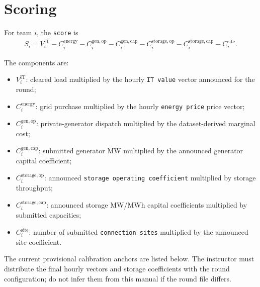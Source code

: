 \documentclass[12pt]{article}
\newcommand{\code}[1]{\texttt{#1}}
\begin{document}
\section{Scoring}\label{sec:score}

For team $i$, the \code{score} is
\[
\begin{aligned}
S_i={}V_i^{\mathrm{IT}}-C_i^{\mathrm{energy}}
-C_i^{\mathrm{gen,op}}-C_i^{\mathrm{gen,cap}}-C_i^{\mathrm{storage,op}}-C_i^{\mathrm{storage,cap}}
-C_i^{\mathrm{site}}.
\end{aligned}
\]

The components are:
\begin{itemize}[leftmargin=*]
  \item $V_i^{\mathrm{IT}}$: cleared load multiplied by the hourly \code{IT value}
  vector announced for the round;
  \item $C_i^{\mathrm{energy}}$: grid purchase multiplied by the hourly \code{energy price}
  price vector;
  \item $C_i^{\mathrm{gen,op}}$: private-generator dispatch multiplied by the
  dataset-derived marginal cost;
  \item $C_i^{\mathrm{gen,cap}}$: submitted generator MW multiplied by the
  announced generator capital coefficient;
  \item $C_i^{\mathrm{storage,op}}$: announced \code{storage operating coefficient}
  multiplied by storage throughput;
  \item $C_i^{\mathrm{storage,cap}}$: announced storage MW/MWh capital
  coefficients multiplied by submitted capacities;
  \item $C_i^{\mathrm{site}}$: number of submitted \code{connection sites} multiplied
  by the announced site coefficient.
\end{itemize}

The current provisional calibration anchors are listed below. The instructor
must distribute the final hourly vectors and storage coefficients with the
round configuration; do not infer them from this manual if the round file
differs.
\end{document}
